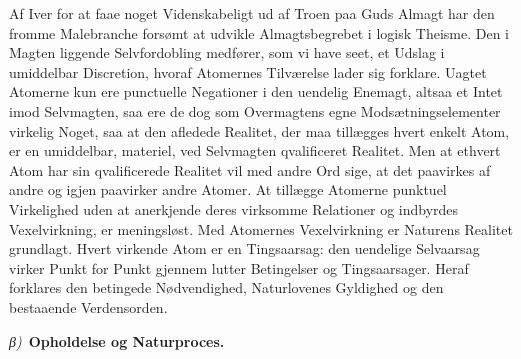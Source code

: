 \documentclass[12pt]{book}
\newcommand{\greekrun}[2]{%
  \medskip\begin{center}{\itshape #1)}\ {\bfseries #2}\end{center}\medskip}
\begin{document}
Af Iver for at faae noget Videnskabeligt ud af Troen paa Guds Almagt
har den fromme Malebranche forsømt at udvikle Almagtsbegrebet i
logisk Theisme. Den i Magten liggende Selvfordobling medfører, som
vi have seet, et Udslag i umiddelbar Discretion, hvoraf
Atomernes Tilværelse lader sig forklare. Uagtet Atomerne kun ere
punctuelle Negationer i den uendelig Enemagt, altsaa et Intet imod
Selvmagten, saa ere de dog som Overmagtens egne
Modsætningselementer virkelig Noget, saa at den afledede Realitet,
der maa tillægges hvert enkelt Atom, er en umiddelbar, materiel, ved
Selvmagten qvalificeret Realitet. Men at ethvert Atom har sin
qvalificerede Realitet vil med andre Ord sige, at det paavirkes af
andre og igjen paavirker andre Atomer. At tillægge Atomerne punktuel
Virkelighed uden at anerkjende deres virksomme Relationer og
indbyrdes Vexelvirkning, er meningsløst. Med Atomernes
Vexelvirkning er Naturens Realitet grundlagt. Hvert virkende Atom er
en Tingsaarsag: den uendelige Selvaarsag virker Punkt for Punkt
gjennem lutter Betingelser og Tingsaarsager. Heraf forklares den
betingede Nødvendighed, Naturlovenes Gyldighed og den bestaaende
Verdensorden.

\greekrun{β}{Opholdelse og Naturproces.}
\end{document}
